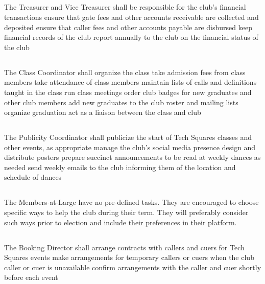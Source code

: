 \documentclass{bylaws}
\begin{document}
\subsection{}The Treasurer and Vice Treasurer shall
\duty be responsible for the club's financial transactions
\duty ensure that gate fees and other accounts receivable are collected and deposited
\duty ensure that caller fees and other accounts payable are disbursed
\duty keep financial records of the club
\duty report annually to the club on the financial status of the club

\subsection{}The Class Coordinator shall
\duty organize the class
\duty take admission fees from class members
\duty take attendance of class members
\duty maintain lists of calls and definitions taught in the class
\duty run class meetings
\duty order club badges for new graduates and other club members
\duty add new graduates to the club roster and mailing lists
\duty organize graduation
\duty act as a liaison between the class and club

\subsection{}The Publicity Coordinator shall
\duty publicize the start of Tech Squares classes and other events, as appropriate
\duty manage the club's social media presence
\duty design and distribute posters
\duty prepare succinct announcements to be read at weekly dances as needed
\duty send weekly emails to the club informing them of the location and schedule of dances

\subsection{}The Members-at-Large have no pre-defined tasks. They are encouraged to choose specific ways to help the club during their term. They will preferably consider such ways prior to election and include their preferences in their platform.

\subsection{}The Booking Director shall
\duty arrange contracts with callers and cuers for Tech Squares events
\duty make arrangements for temporary callers or cuers when the club caller or cuer is unavailable
\duty confirm arrangements with the caller and cuer shortly before each event
\end{document}
